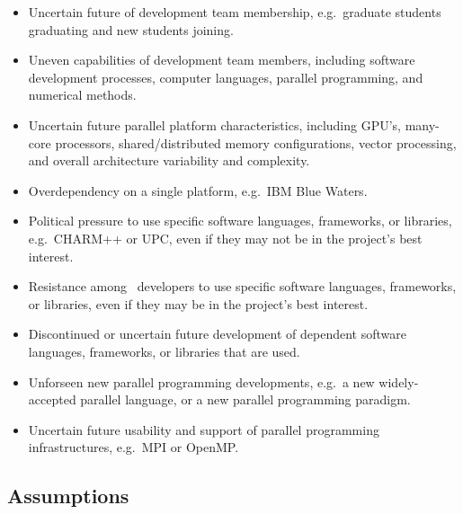 \documentclass[11pt]{article}
\begin{document}
    \begin{itemize} 
%
    \item Uncertain future of development team membership,
    e.g.~graduate students graduating and new students joining.
%
    \item Uneven capabilities of development team members, including
    software development processes, computer languages, parallel
    programming, and numerical methods.
%
    \item Uncertain future parallel platform characteristics,
    including GPU's, many-core processors, shared/distributed memory
    configurations, vector processing, and overall architecture
    variability and complexity.
%
    \item Overdependency on a single platform, e.g.~IBM Blue Waters.
%
    \item Political pressure to use specific software languages, frameworks, or
    libraries, e.g.~CHARM++ or UPC, even if they may not be in the
    project's best interest.
%
    \item Resistance among \cello\ developers to use specific software
    languages, frameworks, or libraries, even if they may be in the
    project's best interest.
%
    \item Discontinued or uncertain future development of dependent software
    languages, frameworks, or libraries that are used.
%
    \item Unforseen new parallel programming developments, e.g.~a new
    widely-accepted parallel language, or a new parallel programming
    paradigm.
%
    \item Uncertain future usability and support of parallel
    programming infrastructures, e.g.~MPI or OpenMP.
%
\end{itemize}


\subsection{Assumptions}

\end{document}
